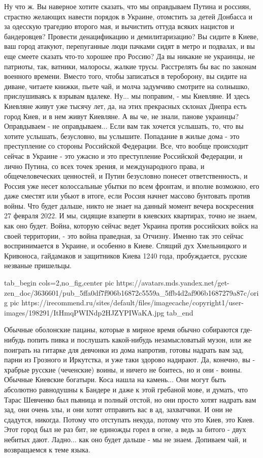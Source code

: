 Ну что ж. Вы наверное хотите сказать, что мы оправдываем Путина и россиян,
страстно желающих навести порядок в Украине, отомстить за детей Донбасса и за
одесскую трагедию второго мая, и вычистить оттуда всяких нацистов и
бандеровцев? Провести денацификацию и демилитаризацию? Вы сидите в Киеве, ваш
город атакуют, перепуганные люди пачками сидят в метро и подвалах, и вы еще
смеете сказать что-то хорошее про Россию? Да вы никакие не украинцы, не
патриоты, так, ватники, малоросы, жалкие трусы. Расстрелять бы вас по законам
военного времени. Вместо того, чтобы записаться в тероборону, вы сидите на
диване, читаете книжки, пьете чай, и молча задумчиво смотрите на солнышко,
прислушиваясь к взрывам вдалеке.  Ну...  мы поправим, - мы Киевляне.  И здесь
Киевляне живут уже тысячу лет, да, на этих прекрасных склонах Днепра есть город
Киев, и в нем живут Киевляне.  А вы че, не знали, панове украинцы?  Оправдываем
- не оправдываем... Если вам так хочется услышать, то, что вы хотите услышать,
безусловно, вы услышите.  Попадание в жилые дома - это преступление со стороны
Российской Федерации.  Все, что вообще происходит сейчас в Украине - это ужасно
и это преступление Российской Федерации, и лично Путина, со всех точек зрения,
и международного права, и общечеловеческих ценностей, и Путин безусловно
понесет ответственность, и Россия уже несет колоссальные убытки по всем
фронтам, и вполне возможно, его даже сместят или убьют в итоге, если Россия
начнет массово бунтовать против войны. Что будет дальше, никто не знает на
данный момент вечера воскресения 27 февраля 2022. И мы, сидящие взаперти в
киевских квартирах, точно не знаем, как оно будет. Война, которую сейчас ведет
Украина против российских войск на своей территории, - это война праведная, за
Отчизну. Именно так это сейчас воспринимается в Украине, и особенно в Киеве.
Спящий дух Хмельницкого и Кривоноса, гайдамаков и защитников Киева 1240 года,
пробуждается, русские незваные пришельцы. 

\ifcmt
  tab_begin cols=2,no_fig,center
     pic https://avatars.mds.yandex.net/get-zen_doc/3636601/pub_5ffa0df7f906b16872c5559a_5ffb4d2af906b1687279a87c/orig
     pic https://irecommend.ru/sites/default/files/imagecache/copyright1/user-images/198291/ItHmqPWINdp2HJZYPIWaKA.jpg
  tab_end
\fi

Обычные оболонские пацаны, которые в мирное время обычно собираются где-нибудь
попить пивка и послушать какой-нибудь незамысловатый музон, или же поиграть на
гитарке для девчонки из дома напротив, готовы надрать вам зад, парни из
Грозного и Иркутстка, и уже таки здорово надирают. Да, конечно, вы - храбрые
русские (чеченские) воины, и ничего не боитесь, но и они - воины. Обычные
Киевские богатыри. Коса нашла на камень...  Они могут быть абсолютно равнодушны
к Бандере и даже к этой гребаной мове, и думать, что Тарас Шевченко был пьяница
и полный отстой, но они просто хотят надрать вам зад, они очень злы, и они
хотят отправить вас в ад, захватчики. И они не сдадутся, никогда. Потому что
отступать некуда, потому что это Киев, это Киев. Этот город был не раз бит, не
единожды горел в огне, а ведь за битого - двух небитых дают. Ладно... как оно
будет дальше - мы не знаем. Допиваем чай, и возвращаемся к теме языка.

